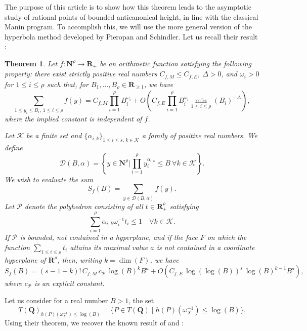 \documentclass{proc-l}
\newcommand{\R}{\mathbf{R}}
\newcommand{\N}{\mathbf{N}}
\newcommand{\Q}{\mathbf{Q}}
\newcommand{\stackP}{\mathcal{P}}
\newcommand{\w}{\omega}
\newtheorem{theorem}{Theorem}[section]
\theoremstyle{definition}
\theoremstyle{remark}
\numberwithin{equation}{section}
\begin{document}
The purpose of this article is to show how this theorem leads to the asymptotic study of rational points of bounded anticanonical height, in line with the classical Manin program. To accomplish this, we will use the more general version of the hyperbola method developed by Pieropan and Schindler. Let us recall their result \cite[Theorem 1.1]{pieropan_hyperbola_method}:

\begin{theorem}\label{theorem_hyperbola_method}
Let $f : \N^{\rho} \rightarrow \R_+$ be an arithmetic function satisfying the following property:
there exist strictly positive real numbers $C_{f,M} \leqslant C_{f,E}$, $\Delta > 0$, and $\w_i > 0$ for $1 \leqslant i \leqslant \rho$ such that, 
for $B_1, \dots, B_{\rho} \in \R_{\geqslant 1}$, we have
$$
\sum\limits_{1 \leqslant y_i \leqslant B_i,\ 1 \leqslant i \leqslant \rho} f(y) 
= C_{f,M} \prod\limits_{i = 1}^{\rho} B_i^{\w_i} 
+ O \!\left( C_{f,E} \prod\limits_{i = 1}^{\rho} B_i^{\w_i} 
\min\limits_{1 \leqslant i \leqslant {\rho}}(B_i)^{-\Delta} \right),
$$
where the implied constant is independent of $f$.  

Let $\mathcal{K}$ be a finite set and $\{\alpha_{i,k}\}_{1 \leqslant i \leqslant s,\, k \in \mathcal{K}}$ a family of positive real numbers.  
We define
$$
\mathcal{D}(B,\alpha) = 
\left\{ y \in \N^{\rho} \Big\vert \prod\limits_{i = 1}^{\rho} y_i^{\alpha_{i,k}} \leqslant B \ \forall k \in \mathcal{K} \right\}.
$$
We wish to evaluate the sum
$$
S_f(B) = \sum\limits_{y \in \mathcal{D}(B,\alpha)} f(y).
$$
Let $\stackP$ denote the polyhedron consisting of all $t \in \R_+^{\rho}$ satisfying
$$
\sum\limits_{i = 1}^{\rho} \alpha_{i,k} \w_i^{-1} t_i \leqslant 1 
\quad \forall k \in \mathcal{K}.
$$
If $\mathcal{P}$ is bounded, not contained in a hyperplane, and if the face $F$ on which the function 
$\sum\limits_{1 \leqslant i \leqslant \rho} t_i$ attains its maximal value $a$ is not contained in a coordinate hyperplane of $\R^{\rho}$, 
then, writing $k = \dim(F)$, we have
$$
S_f(B) = (s - 1 - k)! \, C_{f,M} \, c_{\mathcal{P}} \, \log(B)^k B^{a}
+ O \!\left( C_{f,E} \, \log(\log(B))^s \, \log(B)^{k-1} B^a \right),
$$
where $c_{\mathcal{P}}$ is an explicit constant.
\end{theorem}

Let us consider for a real number $B > 1$, the set $$T(\Q)_{h(P)(\w_X^{-1}) \leqslant \log(B)} = \{ P \in T(\Q) \mid h(P)(\w_X^{-1}) \leqslant \log(B) \} .$$Using their theorem, we recover the known result of \cite[Theorem 11.49]{salberger_torsor} and \cite[Theorem 4.4.4]{darda_yasuda_toric_stacks_batyrev}:
\end{document}

